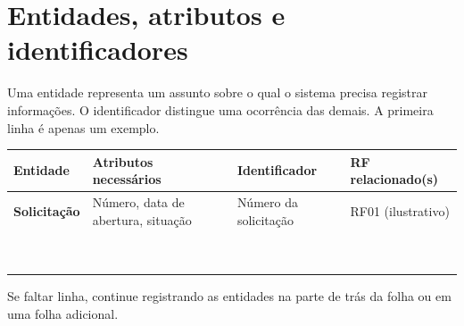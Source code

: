 \section{Entidades, atributos e identificadores}

Uma entidade representa um assunto sobre o qual o sistema precisa registrar informações.
O identificador distingue uma ocorrência das demais. A primeira linha é apenas um exemplo.

\begin{table}[!ht]
\centering
\small
\setlength{\tabcolsep}{4pt}
\renewcommand{\arraystretch}{1.75}
\begin{tabularx}{\linewidth}{|>{\raggedright\arraybackslash}X
                              |>{\raggedright\arraybackslash}X
                              |>{\raggedright\arraybackslash}X
                              |>{\centering\arraybackslash}X|}
\hline
\textbf{Entidade} &
\textbf{Atributos necessários} &
\textbf{Identificador} &
\textbf{RF relacionado(s)} \\
\hline
\textbf{Solicitação} &
Número, data de abertura, situação &
Número da solicitação &
RF01 (ilustrativo) \\
\hline
 & & & \\ \hline
 & & & \\ \hline
 & & & \\ \hline
 & & & \\ \hline
 & & & \\ \hline
 & & & \\ \hline
 & & & \\ \hline
 & & & \\ \hline
 & & & \\ \hline
\end{tabularx}
\end{table}

\begin{warnbox}[Observação]
Se faltar linha, continue registrando as entidades na parte de trás da folha ou em uma folha adicional.
\end{warnbox}

